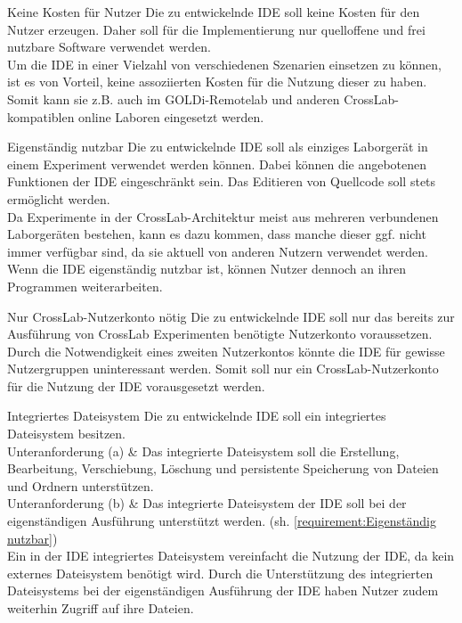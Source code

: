 \begin{requirement}{Keine Kosten für Nutzer}
    \reqdescription Die zu entwickelnde IDE soll keine Kosten für den Nutzer erzeugen. Daher soll für die Implementierung nur quelloffene und frei nutzbare Software verwendet werden.  \\
    \reqrationale Um die IDE in einer Vielzahl von verschiedenen Szenarien einsetzen zu können, ist es von Vorteil, keine assoziierten Kosten für die Nutzung dieser zu haben. Somit kann sie z.B. auch im GOLDi-Remotelab und anderen CrossLab-kompatiblen online Laboren eingesetzt werden. \\
\end{requirement}

\begin{requirement}{Eigenständig nutzbar}
    \reqdescription Die zu entwickelnde IDE soll als einziges Laborgerät in einem Experiment verwendet werden können. Dabei können die angebotenen Funktionen der IDE eingeschränkt sein. Das Editieren von Quellcode soll stets ermöglicht werden. \\
    \reqrationale Da Experimente in der CrossLab-Architektur meist aus mehreren verbundenen Laborgeräten bestehen, kann es dazu kommen, dass manche dieser ggf. nicht immer verfügbar sind, da sie aktuell von anderen Nutzern verwendet werden. Wenn die IDE eigenständig nutzbar ist, können Nutzer dennoch an ihren Programmen weiterarbeiten. \\
\end{requirement}

\begin{requirement}{Nur CrossLab-Nutzerkonto nötig}
    \reqdescription Die zu entwickelnde IDE soll nur das bereits zur Ausführung von CrossLab Experimenten benötigte Nutzerkonto voraussetzen. \\
    \reqrationale Durch die Notwendigkeit eines zweiten Nutzerkontos könnte die IDE für gewisse Nutzergruppen uninteressant werden. Somit soll nur ein CrossLab-Nutzerkonto für die Nutzung der IDE vorausgesetzt werden. \\
\end{requirement}

\begin{requirement}{Integriertes Dateisystem}
    \reqdescription Die zu entwickelnde IDE soll ein integriertes Dateisystem besitzen. \\
    Unteranforderung (a) & Das integrierte Dateisystem soll die Erstellung, Bearbeitung, Verschiebung, Löschung und persistente Speicherung von Dateien und Ordnern unterstützen. \\
    Unteranforderung (b) & Das integrierte Dateisystem der IDE soll bei der eigenständigen Ausführung unterstützt werden. (sh. \autoref{requirement:Eigenständig nutzbar}) \\
    \reqrationale Ein in der IDE integriertes Dateisystem vereinfacht die Nutzung der IDE, da kein externes Dateisystem benötigt wird. Durch die Unterstützung des integrierten Dateisystems bei der eigenständigen Ausführung der IDE haben Nutzer zudem weiterhin Zugriff auf ihre Dateien. \\
\end{requirement}

